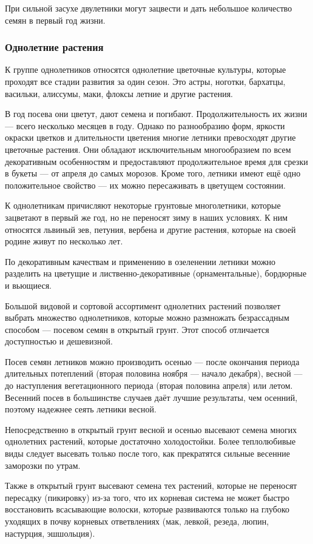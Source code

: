 При сильной засухе двулетники могут зацвести и дать небольшое количество семян в первый год жизни.

\subsubsection{Однолетние растения}

К группе однолетников относятся однолетние цветочные культуры, которые проходят все стадии развития за один сезон. Это астры, ноготки, бархатцы, васильки, алиссумы, маки, флоксы летние и другие растения.

В год посева они цветут, дают семена и погибают. Продолжительность их жизни — всего несколько месяцев в году. Однако по разнообразию форм, яркости окраски цветков и длительности цветения многие летники превосходят другие цветочные растения. Они обладают исключительным многообразием по всем декоративным особенностям и предоставляют продолжительное время  для срезки в букеты — от апреля до самых морозов. Кроме того, летники имеют ещё одно положительное свойство — их можно пересаживать в цветущем состоянии.

К однолетникам причисляют некоторые грунтовые многолетники, которые зацветают в первый же год, но не переносят зиму в наших условиях. К ним относятся львиный зев, петуния, вербена и другие растения, которые на своей родине живут по несколько лет.

По декоративным качествам и применению в озеленении летники можно разделить на цветущие и лиственно-декоративные (орнаментальные), бордюрные и вьющиеся.

Большой видовой и сортовой ассортимент однолетних растений позволяет выбрать множество однолетников, которые можно размножать безрассадным способом — посевом семян в открытый грунт. Этот способ отличается доступностью и дешевизной.

Посев семян летников можно производить осенью — после окончания периода длительных потеплений (вторая половина ноября — начало декабря), весной — до наступления вегетационного периода (вторая половина апреля) или летом. Весенний посев в большинстве случаев даёт лучшие результаты, чем осенний, поэтому надежнее сеять летники весной.

Непосредственно в открытый грунт весной и осенью высевают семена многих однолетних растений, которые достаточно холодостойки. Более теплолюбивые виды следует высевать только после того, как прекратятся сильные весенние заморозки по утрам.

Также в открытый грунт высевают семена тех растений, которые не переносят пересадку (пикировку) из-за того, что их корневая система не может быстро восстановить всасывающие волоски, которые развиваются только на глубоко уходящих в почву корневых ответвлениях (мак, левкой, резеда, люпин, настурция, эшшольция).

